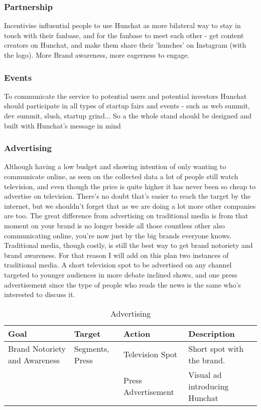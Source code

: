 \documentclass[12pt]{article}
\begin{document}
	\subsubsection{Partnership}
	Incentivise influential people to use Hunchat as more bilateral way to stay in touch with their fanbase, and for the fanbase to meet each other - get content creators on Hunchat, and make them share their 'hunches' on Instagram (with the logo). More Brand awareness, more eagerness to engage.
	
	\subsubsection{Events}
	To communicate the service to potential users and potential investors Hunchat should participate in all types of startup fairs and events - such as web summit, dev summit, slush, startup grind... So a the whole stand should be designed and built with Hunchat's message in mind
	
	\subsubsection{Advertising}
	Although having a low budget and showing intention of only wanting to communicate online, as seen on the collected data a lot of people still watch television, and even though the price is quite higher it has never been so cheap to advertise on television. There's no doubt that's easier to reach the target by the internet, but we shouldn't forget that as we are doing a lot more other companies are too. The great difference from advertising on traditional media is from that moment on your brand is no longer beside all those countless other also communicating online, you're now just by the big brands everyone knows. Traditional media, though costly, is still the best way to get brand notoriety and brand awareness. For that reason I will add on this plan two instances of traditional media. A short television spot to be advertised on any channel targeted to younger audiences in more debate inclined shows, and one press advertisement since the type of people who reads the news is the same who's interested to discuss it. 
	
	\begin{table}[htbp]
	\small
	\caption{Advertising}
	\label{table:advertising}
	\centering
	\begin{tabular}{ @{}P{0.18\textwidth}P{0.17\textwidth}P{0.16\textwidth}P{0.38\textwidth} }
Goal	&	Target		&	Action	&	Description	 \\ \hline
Brand Notoriety and Awareness	&	Segments, Press  &	Television Spot	& 	Short spot with the brand. \\
 &  & Press Advertisement & Visual ad introducing Hunchat 
	 \\ \hline
	\end{tabular}
	\end{table}
	
\end{document}
